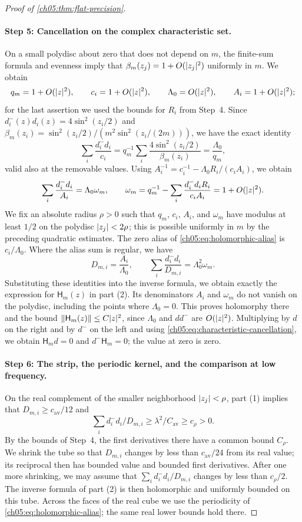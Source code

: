 \begin{proof}[Proof of \cref{ch05:thm:flat-precision}]
\paragraph{Step 5: Cancellation on the complex characteristic set.}
On a small polydisc about zero that does not depend on $m$, the finite-sum formula and evenness imply that $\beta_m(z_j)=1+O(\lvert z_j\rvert^2)$ uniformly in $m$. We obtain
\[
 q_m=1+O(\lvert z\rvert^2),\qquad c_i=1+O(\lvert z\rvert^2),\qquad\Lambda_0=O(\lvert z\rvert^2),\qquad A_i=1+O(\lvert z\rvert^2);
\]
for the last assertion we used the bounds for $R_i$ from Step~4. Since $d_i^-(z)d_i(z)=4\sin^2(z_i/2)$ and $\beta_m(z_i)=\sin^2(z_i/2)/(m^2\sin^2(z_i/(2m)))$, we have the exact identity
\[
 \sum_i\frac{d_i^-d_i}{c_i}=q_m^{-1}\sum_i\frac{4\sin^2(z_i/2)}{\beta_m(z_i)}=\frac{\Lambda_0}{q_m},
\]
valid also at the removable values. Using $A_i^{-1}=c_i^{-1}-\Lambda_0R_i/(c_iA_i)$, we obtain
\begin{equation}\label{ch05:eq:characteristic-cancellation}
 \sum_i\frac{d_i^-d_i}{A_i}=\Lambda_0\omega_m,\qquad\omega_m=q_m^{-1}-\sum_i\frac{d_i^-d_iR_i}{c_iA_i}=1+O(\lvert z\rvert^2).
\end{equation}
We fix an absolute radius $\rho>0$ such that $q_m$, $c_i$, $A_i$, and $\omega_m$ have modulus at least $1/2$ on the polydisc $\lvert z_j\rvert<2\rho$; this is possible uniformly in $m$ by the preceding quadratic estimates. The zero alias of \eqref{ch05:eq:holomorphic-alias} is $c_i/\Lambda_0$. Where the alias sum is regular, we have
\[
 D_{m,i}=\frac{A_i}{\Lambda_0},\qquad\sum_i\frac{d_i^-d_i}{D_{m,i}}=\Lambda_0^2\omega_m.
\]
Substituting these identities into the inverse formula, we obtain exactly the expression for $\mathsf H_m(z)$ in part (2). Its denominators $A_i$ and $\omega_m$ do not vanish on the polydisc, including the points where $\Lambda_0=0$. This proves holomorphy there and the bound $\lVert \mathsf H_m(z)\rVert\le C\lvert z\rvert^2$, since $\Lambda_0$ and $dd^-$ are $O(\lvert z\rvert^2)$. Multiplying by $d$ on the right and by $d^-$ on the left and using \eqref{ch05:eq:characteristic-cancellation}, we obtain $\mathsf H_md=0$ and $d^-\mathsf H_m=0$; the value at zero is zero.

\paragraph{Step 6: The strip, the periodic kernel, and the comparison at low frequency.}
On the real complement of the smaller neighborhood $\lvert z_j\rvert<\rho$, part (1) implies that $D_{m,i}\ge c_{\mathrm{av}}/12$ and
\[
 \sum_id_i^-d_i/D_{m,i}\ge\lambda^2/C_{\mathrm{av}}\ge c_\rho>0.
\]
By the bounds of Step~4, the first derivatives there have a common bound $C_\rho$. We shrink the tube so that $D_{m,i}$ changes by less than $c_{\mathrm{av}}/24$ from its real value; its reciprocal then has bounded value and bounded first derivatives. After one more shrinking, we may assume that $\sum_id_i^-d_i/D_{m,i}$ changes by less than $c_\rho/2$. The inverse formula of part (2) is then holomorphic and uniformly bounded on this tube. Across the faces of the real cube we use the periodicity of \eqref{ch05:eq:holomorphic-alias}; the same real lower bounds hold there.


\end{proof}
